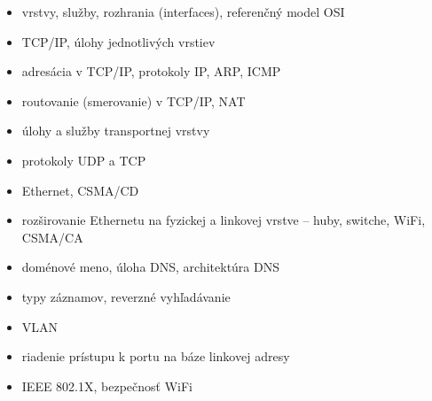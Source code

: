 \documentclass[a4paper]{report}
\begin{document}
\begin{zadanie}
\begin{itemize}
 \item vrstvy, služby, rozhrania (interfaces), referenčný model OSI
 \item TCP/IP, úlohy jednotlivých vrstiev
\end{itemize}
\end{zadanie}

\begin{zadanie}
\begin{itemize}
 \item adresácia v TCP/IP, protokoly IP, ARP, ICMP
 \item routovanie (smerovanie) v TCP/IP, NAT
\end{itemize}
\end{zadanie}

\begin{zadanie}
\begin{itemize}
 \item úlohy a služby transportnej vrstvy
 \item protokoly UDP a TCP
\end{itemize}
\end{zadanie}

\begin{zadanie}
\begin{itemize}
 \item Ethernet, CSMA/CD
 \item rozširovanie Ethernetu na fyzickej a linkovej vrstve – huby, switche, WiFi, CSMA/CA
\end{itemize}
\end{zadanie}

\begin{zadanie}
\begin{itemize}
 \item doménové meno, úloha DNS, architektúra DNS
 \item typy záznamov, reverzné vyhľadávanie
\end{itemize}
\end{zadanie}

\begin{zadanie}
\begin{itemize}
 \item VLAN
 \item riadenie prístupu k portu na báze linkovej adresy
 \item IEEE 802.1X, bezpečnosť WiFi
\end{itemize}
\end{zadanie}
\end{document}
